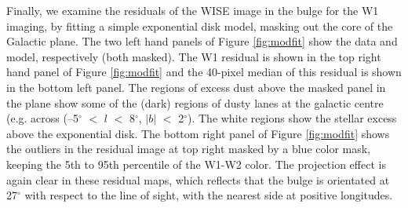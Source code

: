 \documentclass[12pt, preprint]{aastex}
\begin{document}
Finally, we examine the residuals of the WISE image in the bulge for the W1 imaging, by fitting a simple exponential disk model, masking out the core of the Galactic plane. The two left hand panels of Figure \ref{fig:modfit} show the data and model, respectively (both masked). The W1 residual is shown in the top right hand panel of Figure \ref{fig:modfit} and the 40-pixel median of this residual is shown in the bottom left panel. The regions of excess dust above the masked panel in the plane show some of the (dark)  regions of dusty lanes at the galactic centre (e.g. across (--5$^\circ$ $<$ $l$ $<$ 8$^\circ$, $|b|$ $<$ 2$^\circ$). The white regions show the stellar excess above the exponential disk. The bottom right panel of Figure \ref{fig:modfit} shows the outliers in the residual image at top right masked by a blue color mask, keeping the 5th to 95th percentile of the W1-W2 color. The projection effect is again clear in these residual maps, which reflects that the bulge is orientated at 27$^\circ$ with respect to the line of sight, with the nearest side at  positive longitudes. %
\end{document}
